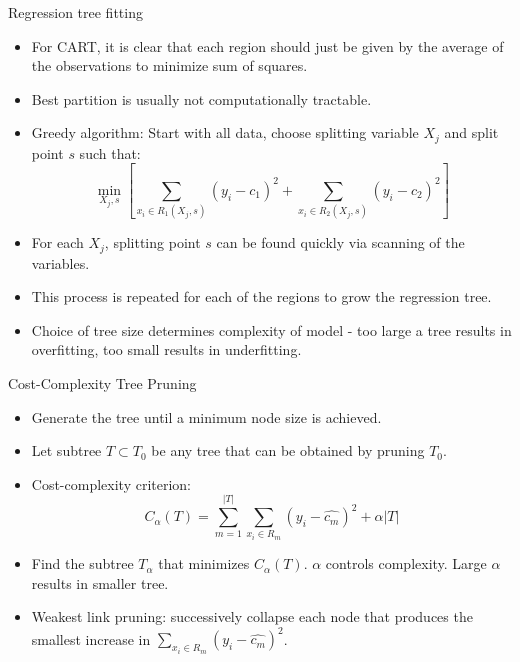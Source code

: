 \documentclass{beamer}
\begin{document}
\begin{frame}{Regression tree fitting}
    \begin{itemize}
        \item For CART, it is clear that each region should just be given by the average of the observations to minimize sum of squares.
        \item Best partition is usually not computationally tractable.
        \item Greedy algorithm: Start with all data, choose splitting variable $X_j$ and split point $s$ such that:
        \begin{equation*}
            \min_{X_j, s} \left[ \sum_{x_i \in R_1(X_j, s)} (y_i - c_1)^2 + \sum_{x_i \in R_2(X_j, s)} (y_i - c_2)^2 \right]
        \end{equation*}
        \item For each $X_j$, splitting point $s$ can be found quickly via scanning of the variables.
        \item This process is repeated for each of the regions to grow the regression tree.
        \item Choice of tree size determines complexity of model - too large a tree results in overfitting, too small results in underfitting.
    \end{itemize}
\end{frame}


\begin{frame}{Cost-Complexity Tree Pruning}
    \begin{itemize}
        \item Generate the tree until a minimum node size is achieved.
        \item Let subtree $T \subset T_0$ be any tree that can be obtained by pruning $T_0$.
        \item Cost-complexity criterion:
        \begin{equation*}
            C_{\alpha}(T) = \sum_{m=1}^{|T|} \sum_{x_i \in R_m} (y_i - \hat{c_m})^2 + \alpha |T|
        \end{equation*}
        \item Find the subtree $T_\alpha$ that minimizes $C_{\alpha}(T)$. $\alpha$ controls complexity. Large $\alpha$ results in smaller tree.
        \item Weakest link pruning: successively collapse each node that produces the smallest increase in $\sum_{x_i \in R_m} (y_i - \hat{c_m})^2$.
    \end{itemize}
\end{frame}
\end{document}
